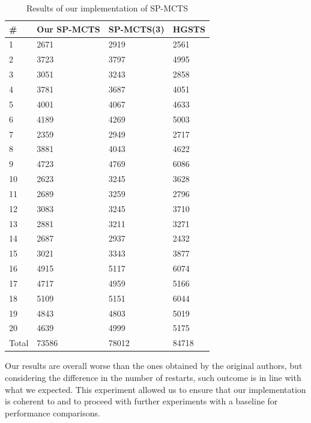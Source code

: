 \begin{table}[!h]
    \centering
    \begin{tabular}{ l | l | l | l }
          \# & Our SP-MCTS & SP-MCTS(3) & HGSTS \\
          \hline			
          1 & 2671 & 2919 & 2561 \\
          2 & 3723 & 3797 & 4995 \\
          3 & 3051 & 3243 & 2858 \\
          4 & 3781 & 3687 & 4051 \\
          5 & 4001 & 4067 & 4633 \\
          6 & 4189 & 4269 & 5003 \\
          7 & 2359 & 2949 & 2717 \\
          8 & 3881 & 4043 & 4622 \\
          9 & 4723 & 4769 & 6086 \\
          10 & 2623 & 3245 & 3628 \\
          11 & 2689 & 3259 & 2796 \\
          12 & 3083 & 3245 & 3710 \\
          13 & 2881 & 3211 & 3271 \\
          14 & 2687 & 2937 & 2432 \\
          15 & 3021 & 3343 & 3877 \\
          16 & 4915 & 5117 & 6074 \\
          17 & 4717 & 4959 & 5166 \\
          18 & 5109 & 5151 & 6044 \\
          19 & 4843 & 4803 & 5019 \\
          20 & 4639 & 4999 & 5175 \\
          \hline  
          Total & 73586 & 78012 & 84718 \\
          \hline 
    \end{tabular}
    \caption[Our SP-MCTS results]{Results of our implementation of SP-MCTS}
    \label{tab:samegame_spmctsresults}
\end{table}

\medskip\noindent
Our results are overall worse than the ones obtained by the original authors, but considering the difference in the number of restarts, such outcome is in line with what we expected. This experiment allowed us to ensure that our implementation is coherent to \cite{DBLP:journals/kbs/SchaddWTU12} and to proceed with further experiments with a baseline for performance comparisons.

